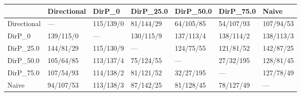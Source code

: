 \begin{tabular}{lllllll}
\toprule
{} & Directional &     DirP\_0 &  DirP\_25.0 &  DirP\_50.0 &  DirP\_75.0 &      Naive \\
\midrule
Directional &         --- &  115/139/0 &  81/144/29 &  64/105/85 &  54/107/93 &  107/94/53 \\
DirP\_0      &   139/115/0 &        --- &  130/115/9 &  137/113/4 &  138/114/2 &  138/113/3 \\
DirP\_25.0   &   144/81/29 &  115/130/9 &        --- &  124/75/55 &  121/81/52 &  142/87/25 \\
DirP\_50.0   &   105/64/85 &  113/137/4 &  75/124/55 &        --- &  27/32/195 &  128/81/45 \\
DirP\_75.0   &   107/54/93 &  114/138/2 &  81/121/52 &  32/27/195 &        --- &  127/78/49 \\
Naive       &   94/107/53 &  113/138/3 &  87/142/25 &  81/128/45 &  78/127/49 &        --- \\
\bottomrule
\end{tabular}
